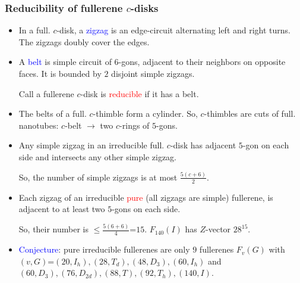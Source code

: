 \documentclass{beamer}
\begin{document}
\begin{frame}\frametitle{Reducibility of fullerene $c$-disks}
\vspace{-3mm}
\begin{itemize}
\item 
In a full. $c$-disk, a \textcolor{blue}{zigzag} is  
an edge-circuit alternating left and right turns. The zigzags doubly cover the edges.

\item A \textcolor{blue}{belt} is simple circuit of $6$-gons, adjacent 
to 
their 
neighbors on
opposite faces. It is bounded by $2$ disjoint simple zigzags.

Call a fullerene $c$-disk is \textcolor{red}{reducible} if it has a 
belt.
\item The belts
 of a full.  $c$-thimble form a cylinder. 
So,  $c$-thimbles are  cuts of full. nanotubes: $c$-belt $\to$ 
two $c$-rings of $5$-gons. 
\item Any simple zigzag in an irreducible full. $c$-disk has  
adjacent $5$-gon on each side and intersects any other  simple zigzag.

So, the number of simple zigzags is at most $\frac{5(c+6)}{2}$.
\item Each
zigzag of  an irreducible 
\textcolor{red}{pure} 
 (all  zigzags are simple) fullerene,  is
adjacent to at least two  $5$-gons on each side. 

So, their number is 
$\le \frac{5(6+6)}{4}$=$15$.
$F_{140}(I)$ has $Z$-vector $28^{15}$. 
\item \textcolor{blue}{Conjecture}: pure irreducible fullerenes 
 are only $9$ fullerenes $F_v(G)$ with 
$(v,G)$=$(20,I_h),(28,T_d),(48,D_3),(60,I_h)$ and
$(60,D_3),(76,D_{2d}),(88,T),(92,T_h),(140,I)$.
\end{itemize}

\end{frame}

\end{document}
